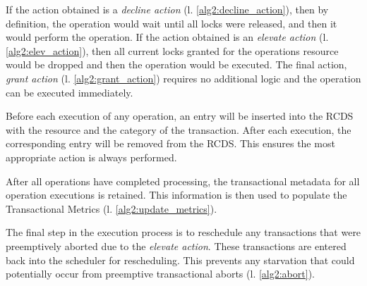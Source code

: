 If the action obtained is a \textit{decline action} (l. \ref{alg2:decline_action}), then by definition, the operation would wait until all locks were released, and then it would perform the operation. If the action obtained is an \textit{elevate action} (l. \ref{alg2:elev_action}), then all current locks granted for the operations resource would be dropped and then the operation would be executed. The final action, \textit{grant action} (l. \ref{alg2:grant_action}) requires no additional logic and the operation can be executed immediately. 


Before each execution of any operation, an entry will be inserted into the RCDS with the resource and the category of the transaction. After each execution, the corresponding entry will be removed from the RCDS. This ensures the most appropriate action is always performed.

After all operations have completed processing, the transactional metadata for all operation executions is retained. This information is then used to populate the Transactional Metrics (l. \ref{alg2:update_metrics}). 


The final step in the execution process is to reschedule any transactions that were preemptively aborted due to the \textit{elevate action}. These transactions are entered back into the scheduler for rescheduling. This prevents any starvation that could potentially occur from preemptive transactional aborts (l. \ref{alg2:abort}).